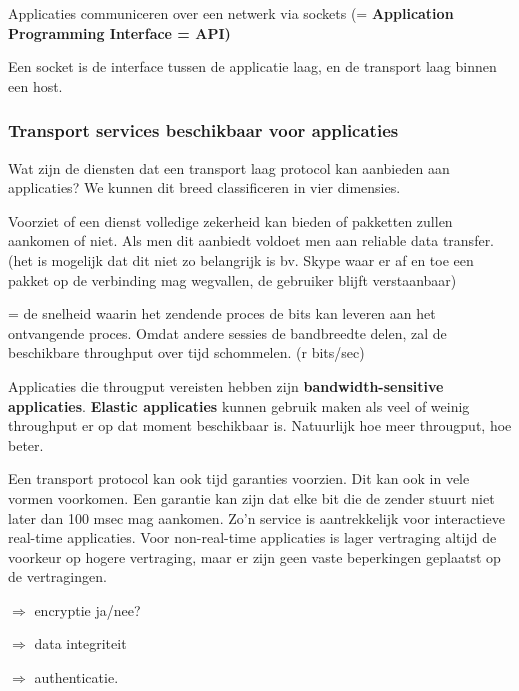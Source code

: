 \noindent Applicaties communiceren over een netwerk via sockets (= \textbf{Application Programming Interface = API)}

\noindent Een socket is de interface tussen de applicatie laag, en de transport laag binnen een host.

\subsubsection{Transport services beschikbaar voor applicaties}

Wat zijn de diensten dat een transport laag protocol kan aanbieden aan applicaties? We kunnen dit breed classificeren in vier dimensies.


Voorziet of een dienst volledige zekerheid kan bieden of pakketten zullen aankomen of niet. Als men dit aanbiedt voldoet men aan reliable data transfer.(het is mogelijk dat dit niet zo belangrijk is bv. Skype waar er af en toe een pakket op de verbinding mag wegvallen, de gebruiker blijft verstaanbaar)


= de snelheid waarin het zendende proces de bits kan leveren aan het ontvangende proces. Omdat andere sessies de bandbreedte delen, zal de beschikbare throughput over tijd schommelen. (r bits/sec)

\noindent Applicaties die througput vereisten hebben zijn \textbf{bandwidth-sensitive applicaties}. 
\noindent \textbf{Elastic applicaties} kunnen gebruik maken als veel of weinig throughput er op dat moment beschikbaar is. Natuurlijk hoe meer througput, hoe beter.


Een transport protocol kan ook tijd garanties voorzien. Dit kan ook in vele vormen voorkomen. Een garantie kan zijn dat elke bit die de zender stuurt niet later dan 100 msec mag aankomen. Zo’n service is aantrekkelijk voor interactieve real-time applicaties. Voor non-real-time applicaties is lager vertraging altijd de voorkeur op hogere vertraging, maar er zijn geen vaste beperkingen geplaatst op de vertragingen.

$\Rightarrow$ encryptie ja/nee?

$\Rightarrow$ data integriteit

$\Rightarrow$ authenticatie.

